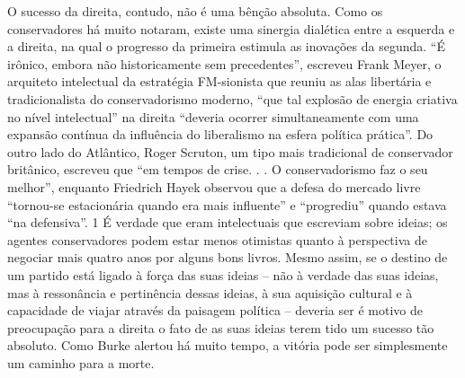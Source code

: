 O sucesso da direita, contudo, não é uma bênção absoluta. Como os conservadores há muito notaram, existe uma sinergia dialética entre a esquerda e a direita, na qual o progresso da primeira estimula as inovações da segunda. “É irônico, embora não historicamente sem precedentes”, escreveu Frank Meyer, o arquiteto intelectual da estratégia FM-sionista que reuniu as alas libertária e tradicionalista do conservadorismo moderno, “que tal explosão de energia criativa no nível intelectual” na direita “deveria ocorrer simultaneamente com uma expansão contínua da influência do liberalismo na esfera política prática”. Do outro lado do Atlântico, Roger Scruton, um tipo mais tradicional de conservador britânico, escreveu que “em tempos de crise. . . O conservadorismo faz o seu melhor”, enquanto Friedrich Hayek observou que a defesa do mercado livre “tornou-se estacionária quando era mais influente” e “progrediu” quando estava “na defensiva”.
 {\color{blue} 1}  
É verdade que eram intelectuais que escreviam sobre ideias; os agentes conservadores podem estar menos otimistas quanto à perspectiva de negociar mais quatro anos por alguns bons livros. Mesmo assim, se o destino de um partido está ligado à força das suas ideias – não à verdade das suas ideias, mas à ressonância e pertinência dessas ideias, à sua aquisição cultural e à capacidade de viajar através da paisagem política – deveria ser é motivo de preocupação para a direita o fato de as suas ideias terem tido um sucesso tão absoluto. Como Burke alertou há muito tempo, a vitória pode ser simplesmente um caminho para a morte.
 
\par
 
